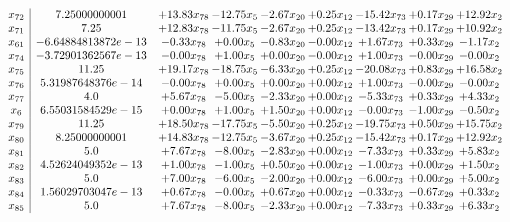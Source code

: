 \documentclass[8pt]{article}
\begin{document}
\[\begin{array}{c| c c@{\hskip 2pt} c@{\hskip 2pt} c@{\hskip 2pt} c@{\hskip 2pt} c@{\hskip 2pt} c@{\hskip 2pt} c@{\hskip 2pt} }
 x_{72}   &  7.25000000001 & + 13.83 x_{78} & -12.75 x_{5} & -2.67 x_{20} & +  0.25 x_{12} & -15.42 x_{73} & +  0.17 x_{29} & + 12.92 x_{2}\\
 x_{71}   &  7.25 & + 12.83 x_{78} & -11.75 x_{5} & -2.67 x_{20} & +  0.25 x_{12} & -13.42 x_{73} & +  0.17 x_{29} & + 10.92 x_{2}\\
 x_{61}   &  -6.64884813872e-13 & -0.33 x_{78} & +  0.00 x_{5} & -0.83 x_{20} & -0.00 x_{12} & +  1.67 x_{73} & +  0.33 x_{29} & -1.17 x_{2}\\
 x_{74}   &  -3.72901362567e-13 & -0.00 x_{78} & +  1.00 x_{5} & +  0.00 x_{20} & -0.00 x_{12} & +  1.00 x_{73} & -0.00 x_{29} & -0.00 x_{2}\\
 x_{75}   &  11.25 & + 19.17 x_{78} & -18.75 x_{5} & -6.33 x_{20} & +  0.25 x_{12} & -20.08 x_{73} & +  0.83 x_{29} & + 16.58 x_{2}\\
 x_{76}   &  5.31987648376e-14 & -0.00 x_{78} & +  0.00 x_{5} & +  0.00 x_{20} & +  0.00 x_{12} & +  1.00 x_{73} & -0.00 x_{29} & -0.00 x_{2}\\
 x_{77}   &  4.0 & +  5.67 x_{78} & -5.00 x_{5} & -2.33 x_{20} & +  0.00 x_{12} & -5.33 x_{73} & +  0.33 x_{29} & +  4.33 x_{2}\\
 x_{6}   &  6.55031584529e-15 & +  0.00 x_{78} & +  1.00 x_{5} & +  1.50 x_{20} & +  0.00 x_{12} & -0.00 x_{73} & -1.00 x_{29} & -0.50 x_{2}\\
 x_{79}   &  11.25 & + 18.50 x_{78} & -17.75 x_{5} & -5.50 x_{20} & +  0.25 x_{12} & -19.75 x_{73} & +  0.50 x_{29} & + 15.75 x_{2}\\
 x_{80}   &  8.25000000001 & + 14.83 x_{78} & -12.75 x_{5} & -3.67 x_{20} & +  0.25 x_{12} & -15.42 x_{73} & +  0.17 x_{29} & + 12.92 x_{2}\\
 x_{81}   &  5.0 & +  7.67 x_{78} & -8.00 x_{5} & -2.83 x_{20} & +  0.00 x_{12} & -7.33 x_{73} & +  0.33 x_{29} & +  5.83 x_{2}\\
 x_{82}   &  4.52624049352e-13 & +  1.00 x_{78} & -1.00 x_{5} & +  0.50 x_{20} & +  0.00 x_{12} & -1.00 x_{73} & +  0.00 x_{29} & +  1.50 x_{2}\\
 x_{83}   &  5.0 & +  7.00 x_{78} & -6.00 x_{5} & -2.00 x_{20} & +  0.00 x_{12} & -6.00 x_{73} & +  0.00 x_{29} & +  5.00 x_{2}\\
 x_{84}   &  1.56029703047e-13 & +  0.67 x_{78} & -0.00 x_{5} & +  0.67 x_{20} & +  0.00 x_{12} & -0.33 x_{73} & -0.67 x_{29} & +  0.33 x_{2}\\
 x_{85}   &  5.0 & +  7.67 x_{78} & -8.00 x_{5} & -2.33 x_{20} & +  0.00 x_{12} & -7.33 x_{73} & +  0.33 x_{29} & +  6.33 x_{2}\\

\end{array}\]
\end{document}
